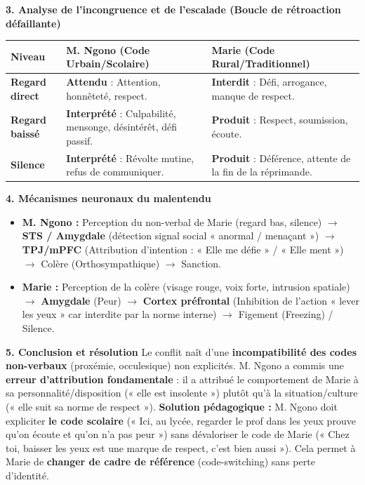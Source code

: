 \documentclass[11pt]{article}
\begin{document}
\begin{exoresolu}
\textbf{3. Analyse de l'incongruence et de l'escalade (Boucle de rétroaction défaillante)}
\begin{center}
\begin{tabularx}{\linewidth}{|l|X|X|}\hline
\textbf{Niveau} & \textbf{M. Ngono (Code Urbain/Scolaire)} & \textbf{Marie (Code Rural/Traditionnel)} \\ \hline
\textbf{Regard direct} & \textbf{Attendu} : Attention, honnêteté, respect. & \textbf{Interdit} : Défi, arrogance, manque de respect. \\ \hline
\textbf{Regard baissé} & \textbf{Interprété} : Culpabilité, mensonge, désintérêt, défi passif. & \textbf{Produit} : Respect, soumission, écoute. \\ \hline
\textbf{Silence} & \textbf{Interprété} : Révolte mutine, refus de communiquer. & \textbf{Produit} : Déférence, attente de la fin de la réprimande. \\ \hline
\end{tabularx}
\end{center}

\textbf{4. Mécanismes neuronaux du malentendu}
\begin{itemize}
    \item \textbf{M. Ngono :} Perception du non-verbal de Marie (regard bas, silence) $\to$ \textbf{STS / Amygdale} (détection signal social « anormal / menaçant ») $\to$ \textbf{TPJ/mPFC} (Attribution d'intention : « Elle me défie » / « Elle ment ») $\to$ Colère (Orthosympathique) $\to$ Sanction.
    \item \textbf{Marie :} Perception de la colère (visage rouge, voix forte, intrusion spatiale) $\to$ \textbf{Amygdale} (Peur) $\to$ \textbf{Cortex préfrontal} (Inhibition de l'action « lever les yeux » car interdite par la norme interne) $\to$ Figement (Freezing) / Silence.
\end{itemize}

\textbf{5. Conclusion et résolution}
Le conflit naît d'une \textbf{incompatibilité des codes non-verbaux} (proxémie, occulesique) non explicités. M. Ngono a commis une \textbf{erreur d'attribution fondamentale} : il a attribué le comportement de Marie à sa personnalité/disposition (« elle est insolente ») plutôt qu'à la situation/culture (« elle suit sa norme de respect »).
\textbf{Solution pédagogique :} M. Ngono doit expliciter \textbf{le code scolaire} (« Ici, au lycée, regarder le prof dans les yeux prouve qu'on écoute et qu'on n'a pas peur ») sans dévaloriser le code de Marie (« Chez toi, baisser les yeux est une marque de respect, c'est bien aussi »). Cela permet à Marie de \textbf{changer de cadre de référence} (code-switching) sans perte d'identité.
\end{exoresolu}
\end{document}
